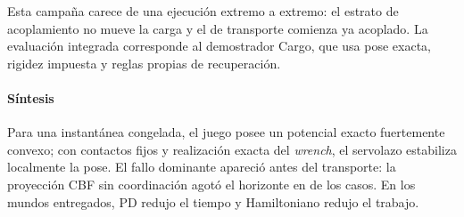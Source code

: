 \begin{table}[!htbp]
  \centering
  \caption{Transporte planar en el estrato abierto nominal de E4-C.}
  \label{tab:sp4-transport-results}
  \resizebox{\textwidth}{!}{}
  \viuownsource
\end{table}

Esta campaña carece de una ejecución extremo a extremo: el estrato de acoplamiento no mueve la carga y el de transporte comienza ya acoplado. La evaluación integrada corresponde al demostrador Cargo, que usa pose exacta, rigidez impuesta y reglas propias de recuperación.

\paragraph{Síntesis}

Para una instantánea congelada, el juego posee un potencial exacto fuertemente convexo; con contactos fijos y realización exacta del \emph{wrench}, el servolazo estabiliza localmente la pose. El fallo dominante apareció antes del transporte: la proyección CBF sin coordinación agotó el horizonte en \SPFourCBFTimeout{} de los casos. En los mundos entregados, PD redujo el tiempo y Hamiltoniano redujo el trabajo.
